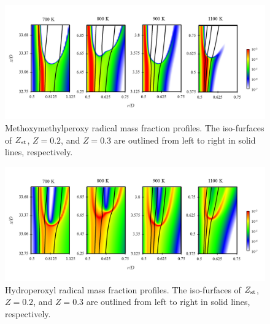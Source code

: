 \documentclass[review,3p,times]{elsarticleUS}
\begin{document}
\begin{figure}[t]
  \centering
  \scriptsize
  \vspace{-0.1in}
  \includegraphics[width=1.0\textwidth]{RO2.png}
  \normalsize
  \vspace{-0.1in}
  \caption{Methoxymethylperoxy radical mass fraction profiles.  The iso-furfaces of $Z_{\rm st}$, $Z = 0.2$, and $Z = 0.3$ are outlined from left to right in solid lines, respectively.}
  \label{fig:RO2}
\end{figure}

\begin{figure}[t]
  \centering
  \scriptsize
  \vspace{-0.1in}
  \includegraphics[width=1.0\textwidth]{HO2.png}
  \normalsize
  \vspace{-0.1in}
  \caption{Hydroperoxyl radical mass fraction profiles.  The iso-furfaces of $Z_{\rm st}$, $Z = 0.2$, and $Z = 0.3$ are outlined from left to right in solid lines, respectively.}
  \label{fig:HO2}
\end{figure}
\end{document}
